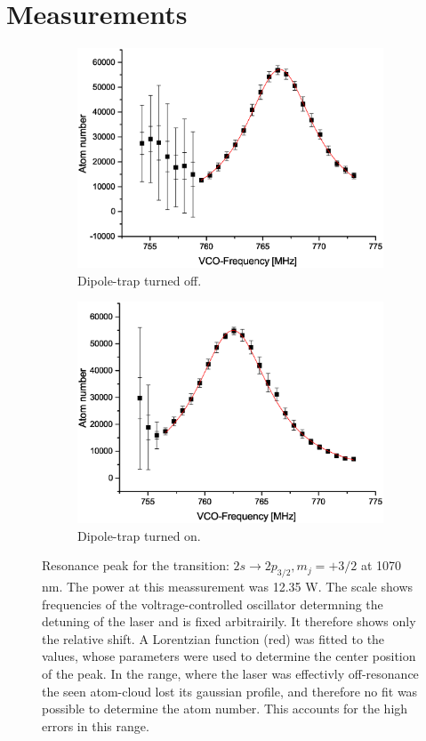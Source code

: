 \chapter{Measurements}

\begin{figure}[H]
\centering
\begin{subfigure}[b]{0.48\textwidth}
                \includegraphics[width=\textwidth]{withoutodt}
                \caption{Dipole-trap turned off.}
\end{subfigure}
\begin{subfigure}[b]{0.48\textwidth}
               \includegraphics[width=\textwidth]{withodt}
                \caption{Dipole-trap turned on.}
\end{subfigure}


\caption{Resonance peak for the transition: $2s\rightarrow2p_{3/2}, m_j=+3/2$ at 1070 nm. The power at this meassurement was 12.35 W. The scale shows frequencies of the voltrage-controlled oscillator determning the detuning of the laser and is fixed arbitrairily. It therefore shows only the relative shift. A Lorentzian function (red) was fitted to the values, whose parameters were used to determine the center position of the peak. In the range, where the laser was effectivly off-resonance the seen atom-cloud lost its gaussian profile, and therefore no fit was possible to determine the atom number. This accounts for the high errors in this range.}
\label{resonance}
\end{figure}

